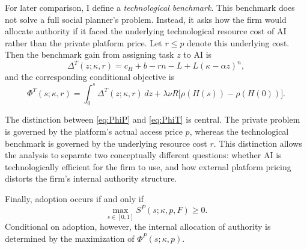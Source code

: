 For later comparison, I define a \emph{technological benchmark}. This benchmark does not solve a full social planner's problem. Instead, it asks how the firm would allocate authority if it faced the underlying technological resource cost of AI rather than the private platform price. Let $r\le p$ denote this underlying cost. Then the benchmark gain from assigning task $z$ to AI is
\begin{equation}
\label{eq:DeltaT}
\Delta^T(z;\kappa,r)
=
c_H+b-rn-L+L(\kappa-\alpha z)^n,
\end{equation}
and the corresponding conditional objective is
\begin{equation}
\label{eq:PhiT}
\Phi^T(s;\kappa,r)
=
\int_0^s \Delta^T(z;\kappa,r)\,dz
+
\lambda \nu R \bigl[\rho(H(s))-\rho(H(0))\bigr].
\end{equation}

The distinction between \eqref{eq:PhiP} and \eqref{eq:PhiT} is central. The private problem is governed by the platform's actual access price $p$, whereas the technological benchmark is governed by the underlying resource cost $r$. This distinction allows the analysis to separate two conceptually different questions: whether AI is technologically efficient for the firm to use, and how external platform pricing distorts the firm's internal authority structure.

Finally, adoption occurs if and only if
\begin{equation}
\label{eq:adoption}
\max_{s\in[0,1]} S^P(s;\kappa,p,F)\ge 0.
\end{equation}
Conditional on adoption, however, the internal allocation of authority is determined by the maximization of $\Phi^P(s;\kappa,p)$.
